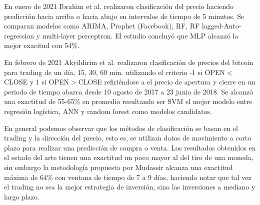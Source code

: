 En enero de 2021 Ibrahim et al. \cite{ibrahimPredictingMarketMovement2021} realizaron clasificación del precio haciendo predicción hacia arriba o hacia abajo en intervalos de tiempo de 5 minutos. Se comparan modelos como ARIMA, Prophet (Facebook), RF, RF lagged-Auto-regression y multi-layer perceptron. El estudio concluyó que MLP alcanzó la mejor exacitud con 54\%.

En febrero de 2021 Akyildirim et al. \cite{akyildirimPredictionCryptocurrencyReturns2021} realizaron clasificación de precios del bitcoin para trading de un día, 15, 30, 60 min. utilizando el criterio -1 si OPEN$<$CLOSE y 1 si OPEN$>$CLOSE refiriéndose a el precio de apertura y cierre en un periodo de tiempo abarca desde 10 agosto de 2017 a 23 junio de 2018. Se alcanzó una exactitud de 55-65\% en promedio resultando ser SVM el mejor modelo entre regresión logística, ANN y random forest como modelos candidatos.

En general podemos observar que los métodos de clasificación se basan en el trading y la dirección del precio, esto es, se utilizan datos de movimiento a corto plazo para realizar una predicción de compra o venta. Los resultados obtenidos en el estado del arte  tienen una exactitud un poco mayor al del tiro de una moneda, sin embargo la metodología propuesta por Mudassir \cite{mudassirTimeseriesForecastingBitcoin2020} alcanza una exactitud máxima de 64\% con ventana de tiempo de 7 a 9 días, haciendo notar que tal vez el trading no sea la mejor estrategia de inversión, sino las inversiones a mediano y largo plazo.
